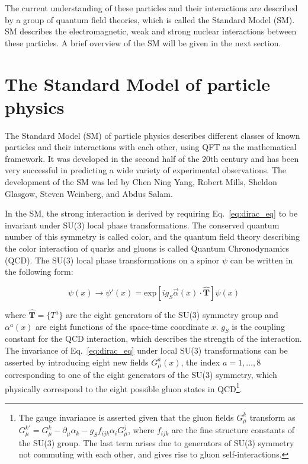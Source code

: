 The current understanding of these particles and their interactions are described by a group of quantum
field theories, which is called the Standard Model (SM). SM describes the electromagnetic, weak and 
strong nuclear interactions between these particles. A brief overview of the SM will be given in the
next section.

\section{The Standard Model of particle physics}

The Standard Model (SM) of particle physics describes different classes of known particles and their interactions
with each other, using QFT as the mathematical framework. It was developed in the second half of the 20th century
and has been very successful in predicting a wide variety of experimental observations. The development of the SM
was led by Chen Ning Yang, Robert Mills, Sheldon Glasgow, Steven Weinberg, and Abdus Salam.

In the SM, the strong interaction is derived by requiring Eq.~\ref{eq:dirac_eq} to be invariant under SU(3)
local phase transformations. The conserved quantum number of this symmetry is called color, and the quantum
field theory describing the color interaction of quarks and gluons is called Quantum Chronodynamics (QCD).
The SU(3) local phase transformations on a spinor $\psi$ can be written in the following form:

\begin{equation}
    \psi(x) \rightarrow \psi'(x) = \text{exp} \left[ i g_S \vec{\alpha}(x) \cdot \hat{\mathbf{T}}  \right]  \psi(x)
\end{equation}

where $\hat{\mathbf{T}} = \{ T^a \}$ are the eight generators of the SU(3) symmetry group and $\alpha^a(x)$ are eight functions
of the space-time coordinate $x$. $g_S$ is the coupling constant for the QCD interaction, which describes the strength
of the interaction. 
The invariance of Eq.~\ref{eq:dirac_eq} under local SU(3) transformations can be asserted by introducing eight new fields
$G_{\mu}^{a}(x)$, the index $a = 1, \dots, 8$ corresponding to one of the eight generators of the SU(3) symmetry, which
physically correspond to the eight possible gluon states in 
QCD\footnote{The gauge invariance is asserted given that the gluon fields $G_{\mu}^{k}$ transform as
$G_{\mu}^{k'} = G_{\mu}^{k} - \partial_{\mu}\alpha_{k} - g_{S}f_{ijk}\alpha_{i}G_{\mu}^{j}$, where $f_{ijk}$ are
the fine structure constants of the SU(3) group. The last term arises due to generators of SU(3) symmetry not commuting
with each other, and gives rise to gluon self-interactions.}.

